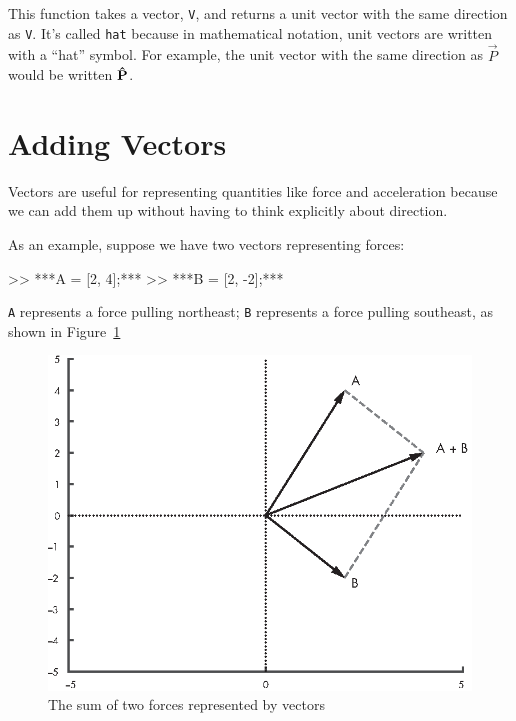 This function takes a vector, \lstinline{V}, and returns a unit vector with the same direction as \lstinline{V}.  It's called \lstinline{hat} because in mathematical notation, unit vectors are written with a ``hat'' symbol.  
For example, the unit vector with the same direction as $\vec{P}$ would be written $\uvec{P}$. 


\section{Adding Vectors}

Vectors are useful for representing quantities like force and acceleration because we can add them up without having to think explicitly about direction.


As an example, suppose we have two vectors representing forces:

\begin{code}
>> ***A = [2, 4];***
>> ***B = [2, -2];***
\end{code}

\lstinline{A} represents a force pulling northeast; \lstinline{B} represents a force pulling southeast, as shown in Figure~\ref{fig:vector2}

\begin{figure}[H]
\includegraphics{book/images/figure12_01_new.eps}
\caption{The sum of two forces represented by vectors}
\label{fig:vector2}
\end{figure}

